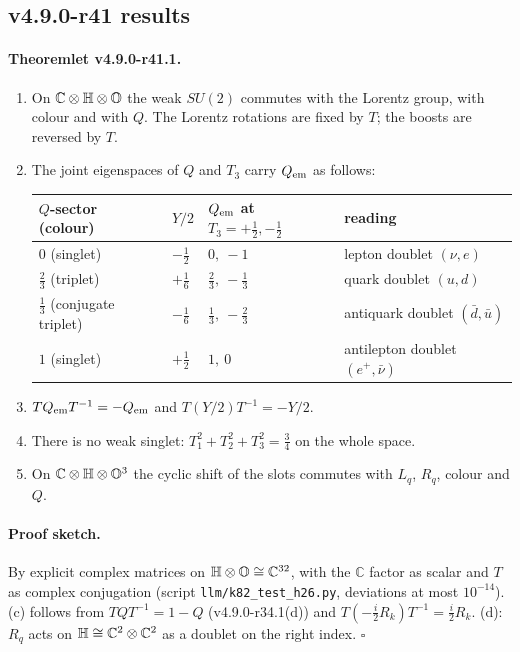 \subsection*{v4.9.0-r41 results}
\label{subsec:v490-r41-results}

\paragraph{Theoremlet v4.9.0-r41.1.}
\begin{enumerate}[leftmargin=2em]
\item[(a)] On \(\mathbb C\otimes\mathbb{H}\otimes\mathbb{O}\) the weak \(SU(2)\) commutes with the Lorentz group, with colour and with \(Q\).  The Lorentz
rotations are fixed by \(T\); the boosts are reversed by \(T\).
\item[(b)] The joint eigenspaces of \(Q\) and \(T_3\) carry \(Q_{\rm em}\) as follows:
\begin{center}
\small
\begin{tabular}{@{}llll@{}}
\toprule
\(Q\)-sector (colour) & \(Y/2\) & \(Q_{\rm em}\) at \(T_3=+\tfrac12,-\tfrac12\) & reading\\
\midrule
\(0\) (singlet) & \(-\tfrac12\) & \(0,\ -1\) & lepton doublet \((\nu,e)\)\\
\(\tfrac23\) (triplet) & \(+\tfrac16\) & \(\tfrac23,\ -\tfrac13\) & quark doublet \((u,d)\)\\
\(\tfrac13\) (conjugate triplet) & \(-\tfrac16\) & \(\tfrac13,\ -\tfrac23\) & antiquark doublet \((\bar d,\bar u)\)\\
\(1\) (singlet) & \(+\tfrac12\) & \(1,\ 0\) & antilepton doublet \((e^+,\bar\nu)\)\\
\bottomrule
\end{tabular}
\end{center}
\item[(c)] \(TQ_{\rm em}T^{-1}=-Q_{\rm em}\) and \(T(Y/2)T^{-1}=-Y/2\).
\item[(d)] There is no weak singlet: \(T_1^2+T_2^2+T_3^2=\tfrac34\) on the whole space.
\item[(e)] On \(\mathbb C\otimes\mathbb{H}\otimes\mathbb{O}^3\) the cyclic shift of the slots commutes with \(L_q\), \(R_q\), colour and \(Q\).
\end{enumerate}

\paragraph{Proof sketch.}
By explicit complex matrices on \(\mathbb{H}\otimes\mathbb{O}\cong\mathbb C^{32}\), with the \(\mathbb C\) factor as scalar and \(T\) as complex conjugation
(script \texttt{llm/k82\_test\_h26.py}, deviations at most \(10^{-14}\)).  (c) follows from \(TQT^{-1}=1-Q\) (v4.9.0-r34.1(d)) and
\(T(-\tfrac i2R_k)T^{-1}=\tfrac i2R_k\).  (d): \(R_q\) acts on \(\mathbb{H}\cong\mathbb C^2\otimes\mathbb C^2\) as a doublet on the right index.  \(\square\)

